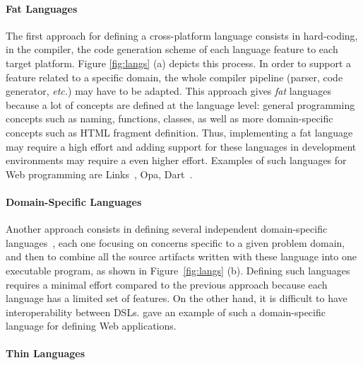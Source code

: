 \documentclass{llncs}
\newcommand{\etc}{\emph{etc.}}
\begin{document}
\paragraph{Fat Languages}

\enlargethispage{0.3cm}

The first approach for defining a cross-platform language consists in hard-coding, in the compiler,
the code generation scheme of each language feature to each target platform. Figure \ref{fig:langs}
(a) depicts this process. In order to support a feature related to a specific domain, the whole
compiler pipeline (parser, code generator, \etc) may have to be adapted. This approach gives
\emph{fat} languages because a lot of concepts are defined at the language level: general
programming concepts such as naming, functions, classes, as well as more domain-specific concepts
such as HTML fragment definition. Thus, implementing a fat language may require a high effort and adding support for these languages in development environments may require a even higher effort.
Examples of such languages for Web programming are Links~\cite{Cooper07_Links}, Opa, Dart~\cite{Griffith11_Dart}.

\paragraph{Domain-Specific Languages}


Another approach consists in defining several independent domain-specific
languages~\cite{Van00_DSL}, each one focusing on concerns specific to a given problem domain, and
then to combine all the source artifacts written with these language into one executable program, as
shown in Figure~\ref{fig:langs} (b). Defining such languages requires a minimal effort compared to
the previous approach because each language has a limited set of features. On the other hand, it is
difficult to have interoperability between DSLs. \cite{Visser07} gave an example of such
a domain-specific language for defining Web applications.

\paragraph{Thin Languages}

\enlargethispage{0.3cm}

\end{document}
